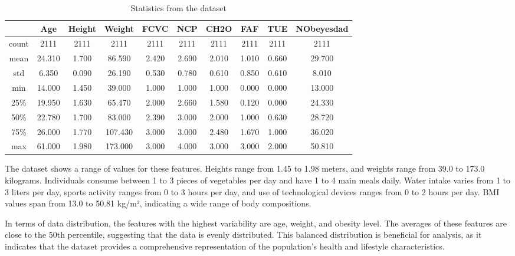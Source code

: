 \documentclass[11pt, a4paper]{article}
\begin{document}
\begin{table}[H]
    \centering
    \begin{tabular}{|c|c|c|c|c|c|c|c|c|c|}
        \hline
              &    Age   & Height   & Weight   & FCVC     & NCP      & CH2O     & FAF      & TUE        & NObeyesdad \\ \hline 
        count &     2111 & 2111     & 2111     & 2111      & 2111    & 2111     & 2111     & 2111       & 2111 \\ \hline
        mean  & 24.310   & 1.700    & 86.590   & 2.420    & 2.690    & 2.010    & 1.010    & 0.660      & 29.700   \\ \hline
        std   & 6.350    & 0.090    & 26.190   & 0.530    & 0.780    & 0.610    & 0.850    & 0.610      & 8.010    \\ \hline
        min   & 14.000   & 1.450    & 39.000   & 1.000    & 1.000    & 1.000    & 0.000    & 0.000      & 13.000   \\ \hline
        25\%  & 19.950   & 1.630    & 65.470   & 2.000    & 2.660    & 1.580    & 0.120    & 0.000      & 24.330   \\ \hline
        50\%  & 22.780   & 1.700    & 83.000   & 2.390    & 3.000    & 2.000    & 1.000    & 0.630      & 28.720   \\ \hline
        75\%  & 26.000   & 1.770    & 107.430  & 3.000    & 3.000    & 2.480    & 1.670    & 1.000      & 36.020   \\ \hline
        max   & 61.000   & 1.980    & 173.000  & 3.000    & 4.000    & 3.000    & 3.000    & 2.000      & 50.810   \\ \hline
    \end{tabular}
    \caption{Statistics from the dataset}
    \label{tab:table_statistics}
\end{table}

\vspace{1em}The dataset shows a range of values for these features. Heights range from 1.45 to 1.98 meters, and weights range from 39.0 to 173.0 kilograms. 
Individuals consume between 1 to 3 pieces of vegetables per day and have 1 to 4 main meals daily. Water intake varies from 1 to 3 liters per day, 
sports activity ranges from 0 to 3 hours per day, and use of technological devices ranges from 0 to 2 hours per day. BMI values span 
from 13.0 to 50.81 kg/m², indicating a wide range of body compositions.

\vspace{1em}In terms of data distribution, the features with the highest variability are age, weight, and obesity level. The averages of these features are 
close to the 50th percentile, suggesting that the data is evenly distributed. This balanced distribution is beneficial for analysis, as it 
indicates that the dataset provides a comprehensive representation of the population's health and lifestyle characteristics.
\end{document}
